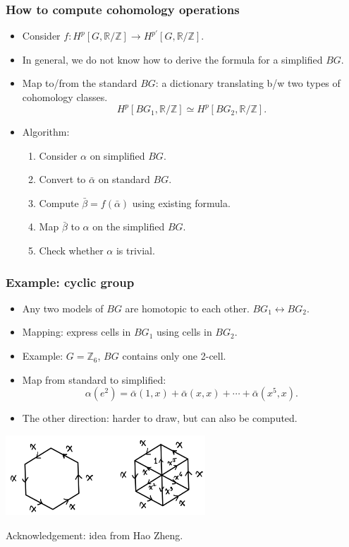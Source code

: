 \documentclass[xcolor=table, aspectratio=169]{beamer}
\newcommand{\uone}{\mathbb R/\mathbb Z}
\begin{document}
\begin{frame}
	\frametitle{How to compute cohomology operations}
	\begin{itemize}
		\item Consider $f: H^p[G,\uone]\rightarrow H^{p'}[G, \uone]$.
		\item In general, we do not know how to derive the formula for a simplified $BG$.
		\item Map to/from the standard $BG$: a dictionary translating b/w two types of cohomology classes.
		\[H^p[BG_1,\uone]\simeq H^p[BG_2,\uone].\]
		\item Algorithm:
		\begin{enumerate}
			\item Consider $\alpha$ on simplified $BG$.
			\item Convert to $\bar\alpha$ on standard $BG$.
			\item Compute $\bar\beta = f(\bar\alpha)$ using existing formula.
			\item Map $\bar\beta$ to $\alpha$ on the simplified $BG$.
			\item Check whether $\alpha$ is trivial.
		\end{enumerate}
	\end{itemize}
\end{frame}

\begin{frame}
	\frametitle{Example: cyclic group}
	\begin{itemize}
		\item Any two models of $BG$ are homotopic to each other. $BG_1\leftrightarrow BG_2$.
		\item Mapping: express cells in $BG_1$ using cells in $BG_2$.
		\item Example: $G=\mathbb Z_6$, $BG$ contains only one 2-cell.
		\item Map from standard to simplified:
		\[\alpha(e^2) = \bar\alpha(1, x)+\bar\alpha(x, x)
		+\cdots+\bar\alpha(x^5, x).\]
		\item The other direction: harder to draw, but can also be computed.
	\end{itemize}
	\begin{center}
		\includegraphics[height=3cm]{z6}

		{\footnotesize Acknowledgement: idea from Hao Zheng.}
	\end{center}
\end{frame}
\end{document}
